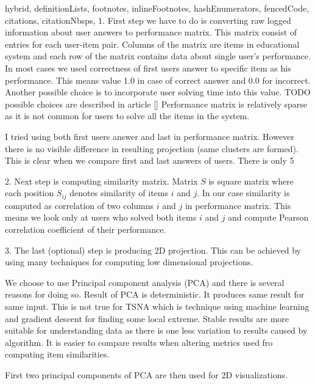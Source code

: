 \documentclass[
  digital, %
  table,   %
  nolof,     %
  nolot,     %
  nocover
]{fithesis3}
\begin{document}
\begin{markdown*}{%
  hybrid,
  definitionLists,
  footnotes,
  inlineFootnotes,
  hashEnumerators,
  fencedCode,
  citations,
  citationNbsps,
}
1. First step we have to do is converting raw logged information about user answers to performance matrix. This matrix consist of entries for each user-item pair. Columns of the matrix are items in educational system and each row of the matrix contains data about single user's performance. In most cases we used correctness of first users answer to specific item as his performance. This means value 1.0 in case of correct answer and 0.0 for incorrect. Another possible choice is to incorporate user solving time into this value. TODO possible choices are described in article [] Performance matrix is relatively sparse as it is not common for users to solve all the items in the system.

I tried using both first users answer and last in performance matrix. However there is no visible difference in resulting projection (same clusters are formed). This is clear when we compare first and last answers of users. There is only 5%


2. Next step is computing similarity matrix. Matrix $S$ is square matrix where each position $S_{ij}$ denotes similarity of items $i$ and $j$. In our case similarity is computed as correlation of two columns $i$ and $j$ in performance matrix. This means we look only at users who solved both items $i$ and $j$ and compute Pearson correlation coefficient of their performance.


3. The last (optional) step is producing 2D projection. This can be achieved by using many techniques for computing low dimensional projections.


We choose to use Principal component analysis (PCA) and there is several reasons for doing so.
Result of PCA is deterministic. It produces same result for same input. This is not true for TSNA which is technique using machine learning and gradient descent for finding some local extreme. Stable results are more suitable for understanding data as there is one less variation to results caused by algorithm. It is easier to compare results when altering metrics used fro computing item similarities.

First two principal components of PCA are then used for 2D visualizations.



\end{markdown*}
\end{document}
